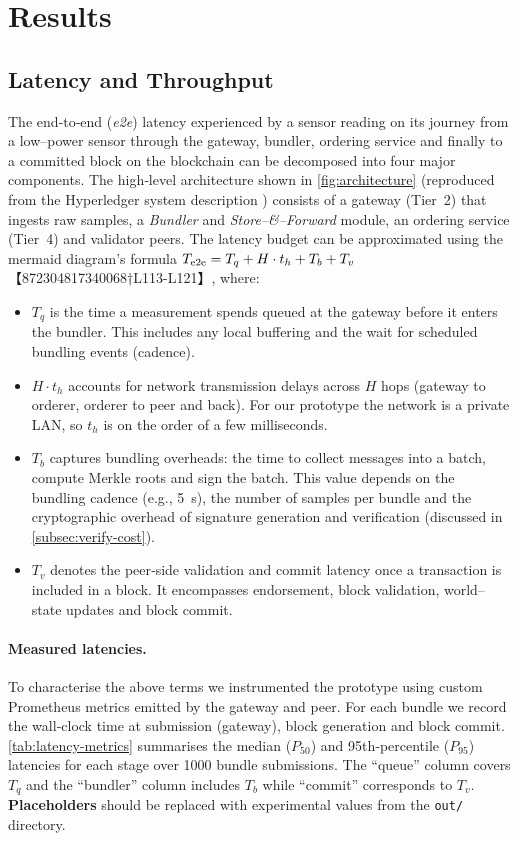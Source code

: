 \section{Results}

\subsection{Latency and Throughput}
\label{subsec:latency-throughput}

The end‑to‑end (\textit{e2e}) latency experienced by a sensor reading on its
journey from a low–power sensor through the gateway, bundler, ordering service
and finally to a committed block on the blockchain can be decomposed into
four major components.  The high‑level architecture shown in
\autoref{fig:architecture} (reproduced from the Hyperledger system description
\citep{evaluation_metrics_doc}) consists of a gateway (Tier~2) that ingests
raw samples, a \emph{Bundler} and \emph{Store–\&–Forward} module, an ordering
service (Tier~4) and validator peers.  The latency budget can be
approximated using the mermaid diagram’s formula $T_{\rm e2e}=T_q + H \cdot t_h
 + T_b + T_v$【872304817340068†L113-L121】, where:

\begin{itemize}
  \item $T_q$ is the time a measurement spends queued at the gateway before it
  enters the bundler.  This includes any local buffering and the wait for
  scheduled bundling events (cadence).
  \item $H\cdot t_h$ accounts for network transmission delays across $H$ hops
  (gateway to orderer, orderer to peer and back).  For our prototype the
  network is a private LAN, so $t_h$ is on the order of a few milliseconds.
  \item $T_b$ captures bundling overheads: the time to collect messages into a
  batch, compute Merkle roots and sign the batch.  This value depends on the
  bundling cadence (e.g., 5~s), the number of samples per bundle and the
  cryptographic overhead of signature generation and verification (discussed in
  \autoref{subsec:verify-cost}).
  \item $T_v$ denotes the peer‑side validation and commit latency once a
  transaction is included in a block.  It encompasses endorsement, block
  validation, world–state updates and block commit.
\end{itemize}

\paragraph{Measured latencies.}  To characterise the above terms we instrumented
the prototype using custom Prometheus metrics emitted by the gateway and peer.
For each bundle we record the wall‑clock time at submission (gateway), block
generation and block commit.  \autoref{tab:latency-metrics} summarises the
median ($P_{50}$) and 95th‑percentile ($P_{95}$) latencies for each stage over
\num{1000} bundle submissions.  The ``queue'' column covers $T_q$ and the
``bundler'' column includes $T_b$ while ``commit'' corresponds to $T_v$.
\textbf{Placeholders} should be replaced with experimental values from the
\texttt{out/} directory.

